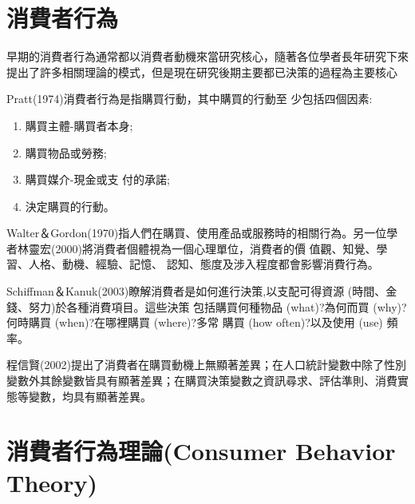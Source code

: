 \section{消費者行為}
早期的消費者行為通常都以消費者動機來當研究核心，隨著各位學者長年研究下來提出了許多相關理論的模式，但是現在研究後期主要都已決策的過程為主要核心

Pratt(1974)消費者行為是指購買行動，其中購買的行動至 少包括四個因素\cite{Pratt1974}:
\begin{enumerate}
\item 購買主體-購買者本身; 
\item  購買物品或勞務;
\item  購買媒介-現金或支 付的承諾;
\item  決定購買的行動。
\end{enumerate}

Walter＆Gordon(1970)指人們在購買、使用產品或服務時的相關行為\cite{Walter1970}。另一位學者林靈宏(2000)將消費者個體視為一個心理單位，消費者的價 值觀、知覺、學習、人格、動機、經驗、記憶、 認知、態度及涉入程度都會影響消費行為\cite{林靈宏}。

Schiffman＆Kanuk(2003)瞭解消費者是如何進行決策,以支配可得資源 (時間、金錢、努力)於各種消費項目。這些決策 包括購買何種物品 (what)?為何而買 (why)? 何時購買 (when)?在哪裡購買 (where)?多常 購買 (how often)?以及使用 (use) 頻率\cite{Schiffman}。

程信賢(2002)提出了消費者在購買動機上無顯著差異；在人口統計變數中除了性別變數外其餘變數皆具有顯著差異；在購買決策變數之資訊尋求、評估準則、消費實態等變數，均具有顯著差異\cite{程信賢}。

\section{消費者行為理論(Consumer Behavior Theory)}
